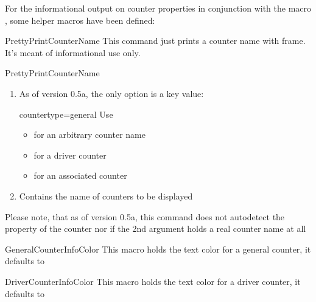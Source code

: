 \documentclass[12pt,paper=a4]{ltxdoc}
\def\packageversion{0.5a}%
\begin{document}
For the informational output on counter properties in conjunction with the macro
 , some helper macros have been defined:

\begin{docCommand}{PrettyPrintCounterName}{}
This command just prints a counter name with frame. It's meant of informational use only.
\begin{docCommandArgs}{PrettyPrintCounterName}
\begin{enumerate}[label={\textcolor{blue}{\#\arabic*}}]
\item {}%

  As of version \packageversion, the only option is a key value:
  \begin{docKey}{countertype}{=}{general}
    Use
    \begin{itemize}
    \item {} for an arbitrary counter name
    \item {} for a driver counter
    \item {} for an associated counter
    \end{itemize}
  \end{docKey}

\item {}
  Contains the name of counters to be displayed

\end{enumerate}
\end{docCommandArgs}%

Please note, that as of version \packageversion, this command does not autodetect the property of the counter nor if the 2nd argument holds a real counter name at all 
\end{docCommand}%

\begin{docCommand}{GeneralCounterInfoColor}{}
This macro holds the text color for a general counter, it defaults to \meta{\textcolor{\GeneralCounterInfoColor}{\expandafter{\GeneralCounterInfoColor}}}%
\end{docCommand}


\begin{docCommand}{DriverCounterInfoColor}{}
This macro holds the text color for a driver counter, it defaults to \meta{\textcolor{\DriverCounterInfoColor}{\expandafter{\DriverCounterInfoColor}}}%
\end{docCommand}
\end{document}
